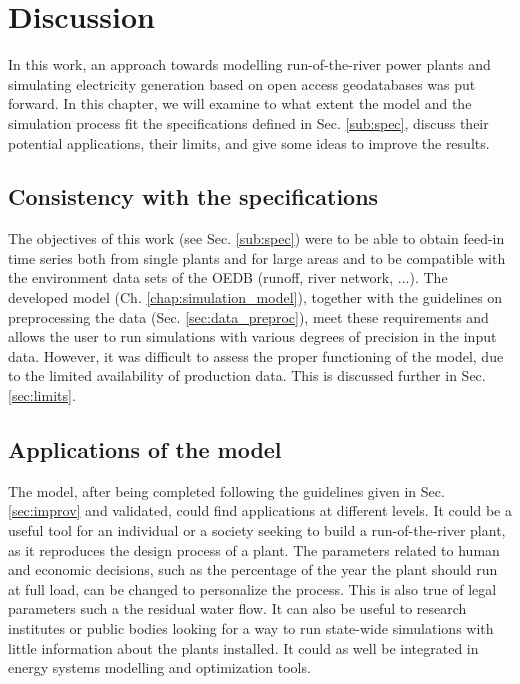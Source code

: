 \chapter{Discussion}
\label{chap:discussion}

In this work, an approach towards modelling run-of-the-river power plants and simulating electricity generation based on open access geodatabases was put forward. In this chapter, we will examine to what extent the model and the simulation process fit the specifications defined in Sec. \ref{sub:spec}, discuss their potential applications, their limits, and give some ideas to improve the results.
\section{Consistency with the specifications}

The objectives of this work (see Sec. \ref{sub:spec}) were to be able to obtain feed-in time series both from single plants and for large areas and to be compatible with the environment data sets of the OEDB (runoff, river network, ...). The developed model (Ch. \ref{chap:simulation_model}), together with the guidelines on preprocessing the data (Sec. \ref{sec:data_preproc}), meet these requirements and allows the user to run simulations with various degrees of precision in the input data. However, it was difficult to assess the proper functioning of the model, due to the limited availability of production data. This is discussed further in Sec. \ref{sec:limits}.

\section{Applications of the model}

The model, after being completed following the guidelines given in Sec. \ref{sec:improv} and validated, could find applications at different levels. It could be a useful tool for an individual or a society seeking to build a run-of-the-river plant, as it reproduces the design process of a plant. The parameters related to human and economic decisions, such as the percentage of the year the plant should run at full load, can be changed to personalize the process. This is also true of legal parameters such a the residual water flow. \newline
It can also be useful to research institutes or public bodies looking for a way to run state-wide simulations with little information about the plants installed. It could as well be integrated in energy systems modelling and optimization tools.

